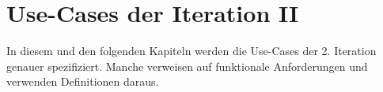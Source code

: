 \chapter{Use-Cases der Iteration II}
In diesem und den folgenden Kapiteln werden die Use-Cases der
2. Iteration genauer spezifiziert. Manche verweisen auf funktionale
Anforderungen und verwenden Definitionen daraus.
